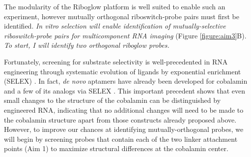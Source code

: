 The modularity of the Riboglow platform is well suited to enable such an experiment, however mutually orthogonal riboswitch-probe pairs must first be identified. \textit{In vitro selection will enable identification of mutually-selective riboswitch-probe pairs for multicomponent RNA imaging} (Figure \ref{figure:aim3}B). \textit{To start, I will identify two orthogonal riboglow probes.}

Fortunately, screening for substrate selectivity is well-precedented in RNA engineering through systematic evolution of ligands by exponential enrichment (SELEX) \cite{MairalAptamersmoleculartools2008,ChoApplicationsAptamersSensors2009}.
In fact, \textit{de novo} aptamers have already been developed for cobalamin and a few of its analogs via SELEX \cite{LorschvitroselectionRNA1994}. This important precedent shows that even small changes to the structure of the cobalamin can be distinguished by engineered RNA, indicating that no additional changes will need to be made to the cobalamin structure apart from those constructs already proposed above. However, to improve our chances at identifying mutually-orthogonal probes, we will begin by screening probes that contain each of the two linker attachment points (Aim 1) to maximize structural differences at the cobalamin center.

